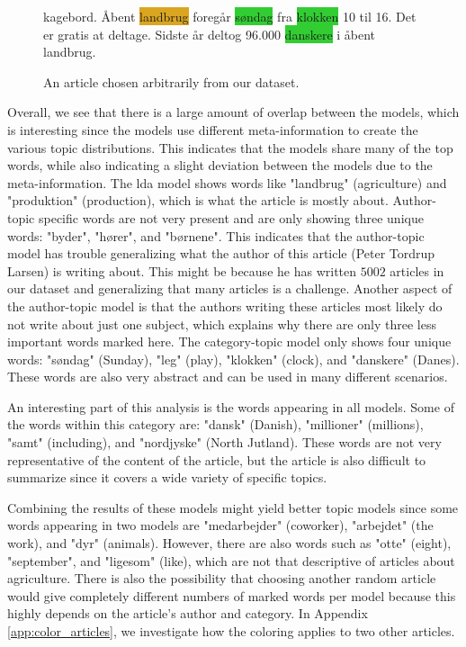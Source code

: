 \begin{figure}
\begin{tcolorbox}
{kagebord. Åbent \colorbox{Goldenrod}{landbrug} foregår \colorbox{LimeGreen}{søndag} fra \colorbox{LimeGreen}{klokken} 10 til 16. Det er gratis at deltage. Sidste år deltog 96.000 \colorbox{LimeGreen}{danskere} i åbent landbrug.
		}
	\end{tcolorbox}
	\caption{An article chosen arbitrarily from our dataset.}
	\label{fig:the_article}
\end{figure}

Overall, we see that there is a large amount of overlap between the models, which is interesting since the models use different meta-information to create the various topic distributions.
This indicates that the models share many of the top words, while also indicating a slight deviation between the models due to the meta-information.
The \gls{lda} model shows words like "landbrug" (agriculture) and "produktion" (production), which is what the article is mostly about.
Author-topic specific words are not very present and are only showing three unique words: "byder", "hører", and "børnene".
This indicates that the author-topic model has trouble generalizing what the author of this article (Peter Tordrup Larsen) is writing about. 
This might be because he has written $5002$ articles in our dataset and generalizing that many articles is a challenge.
Another aspect of the author-topic model is that the authors writing these articles most likely do not write about just one subject, which explains why there are only three less important words marked here. 
The category-topic model only shows four unique words: "søndag" (Sunday), "leg" (play), "klokken" (clock), and "danskere" (Danes).
These words are also very abstract and can be used in many different scenarios.

An interesting part of this analysis is the words appearing in all models.
Some of the words within this category are: "dansk" (Danish), "millioner" (millions), "samt" (including), and "nordjyske" (North Jutland).
These words are not very representative of the content of the article, but the article is also difficult to summarize since it covers a wide variety of specific topics.

Combining the results of these models might yield better topic models since some words appearing in two models are "medarbejder" (coworker), "arbejdet" (the work), and "dyr" (animals).
However, there are also words such as "otte" (eight), "september", and "ligesom" (like), which are not that descriptive of articles about agriculture. 
There is also the possibility that choosing another random article would give completely different numbers of marked words per model because this highly depends on the article's author and category.
In Appendix \autoref{app:color_articles}, we investigate how the coloring applies to two other articles.




